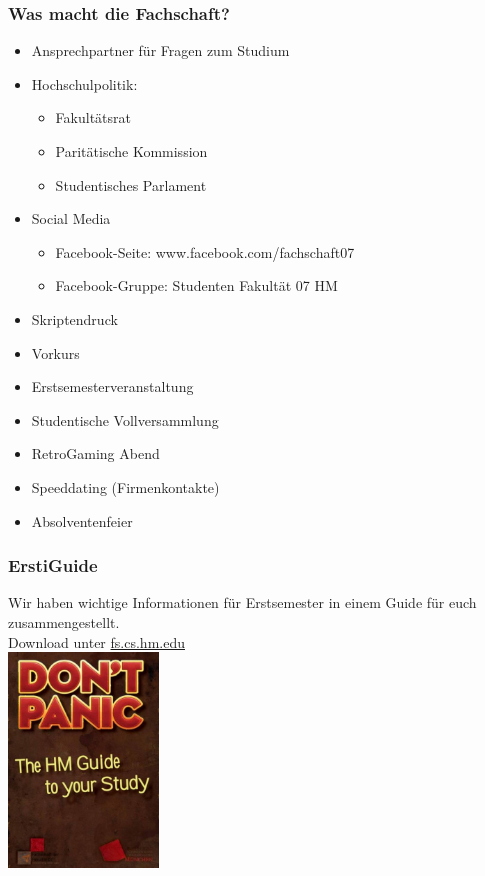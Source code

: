 \documentclass{beamer}
\begin{document}
    \begin{frame}[t]
    	\frametitle{Was macht die Fachschaft?}
    	
    	\begin{itemize}
    		\item Ansprechpartner für Fragen zum Studium
    		\item Hochschulpolitik:
    		\begin{itemize}
    			\item Fakultätsrat
    			\item Paritätische Kommission
    		    \item Studentisches Parlament
    		\end{itemize}
    		\item Social Media
    		\begin{itemize}
    			\item Facebook-Seite: www.facebook.com/fachschaft07
    			\item Facebook-Gruppe: Studenten Fakultät 07 HM
    		\end{itemize}
    		\item Skriptendruck
    		\item Vorkurs
    		\item Erstsemesterveranstaltung
    		\item Studentische Vollversammlung
    		\item RetroGaming Abend
    		\item Speeddating (Firmenkontakte)
    		\item Absolventenfeier
    	\end{itemize}
    \end{frame}
    
    \begin{frame}[t]
    	\frametitle{ErstiGuide}
    	Wir haben wichtige Informationen für Erstsemester in einem Guide für euch zusammengestellt.\\
    	\bigskip
    	Download unter \url{fs.cs.hm.edu}\\
    	\center
    	\includegraphics[width=0.3\textwidth]{erstiguide.jpg}
    \end{frame}
    
\end{document}
